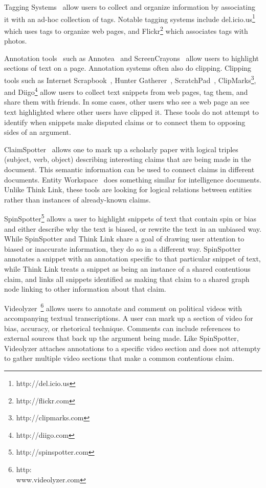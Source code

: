 \documentclass{chi2009}
\begin{document}
Tagging Systems~\cite{Marlow2006,Golder2006} allow users to collect and organize information by associating it with an ad-hoc collection of tags. Notable tagging systems include del.icio.us\footnote{http://del.icio.us} which uses tags to organize web pages, and Flickr\footnote{http://flickr.com} which associates tags with photos. 

Annotation tools~\cite{Marshall1998} such as Annotea~\cite{Koivunen2001} and ScreenCrayons~\cite{Olsen2004} allow users to highlight sections of text on a page. Annotation systems often also do clipping. Clipping tools such as Internet Scrapbook~\cite{Sugiura1998}, Hunter Gatherer~\cite{Schraefel2002}, ScratchPad~\cite{Gotz2007}, ClipMarks\footnote{http://clipmarks.com}, and Diigo\footnote{http://diigo.com} allow users to collect text snippets from web pages, tag them, and share them with friends. In some cases, other users who see a web page an see text highlighted where other users have clipped it. These tools do not attempt to identify when snippets make disputed claims or to connect them to opposing sides of an argument.

ClaimSpotter~\cite{Sereno2005,Sereno2004} allows one to mark up a scholarly paper with logical triples (subject, verb, object) describing interesting claims that are being made in the document. This semantic information can be used to connect claims in different documents. Entity Workspace~\cite{Bier2006} does something similar for intelligence documents. Unlike Think Link, these tools are looking for logical relations between entities rather than instances of already-known claims.

SpinSpotter\footnote{http://spinspotter.com} allows a user to highlight snippets of text that contain spin or bias and either describe why the text is biased, or rewrite the text in an unbiased way. While SpinSpotter and Think Link share a goal of drawing user attention to biased or inaccurate information, they do so in a different way. SpinSpotter annotates a snippet with an annotation specific to that particular snippet of text, while Think Link treats a snippet as being an instance of a shared contentious claim, and links all snippets identified as making that claim to a shared graph node linking to other information about that claim.

Videolyzer~\cite{Diakopoulos2008}\footnote{http:\\www.videolyzer.com} allows users to annotate and comment on political videos with accompanying textual transcriptions. A user can mark up a section of video for bias, accuracy, or rhetorical technique. Comments can include references to external sources that back up the argument being made. Like SpinSpotter, Videolyzer attaches annotations to a specific video section and does not attempty to gather multiple video sections that make a common contentious claim.
\end{document}
